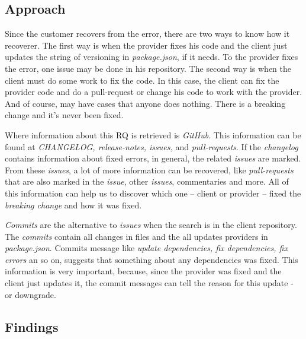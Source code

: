 \subsection{Approach}
\label{apr:rq3}

Since the customer recovers from the error, there are two ways to know how it recoverer. The first way is when the provider fixes his code and the client just updates the string of versioning in \textit{package.json}, if it needs. To the provider fixes the error, one issue may be done in his repository. The second way is when the client must do some work to fix the code. In this case, the client can fix the provider code and do a pull-request or change his code to work with the provider. And of course, may have cases that anyone does nothing. There is a breaking change and it’s never been fixed.

Where information about this RQ is retrieved is \textit{GitHub}. This information can be found at \textit{CHANGELOG, release-notes, issues,} and \textit{pull-requests}. If the \textit{changelog} contains information about fixed errors, in general, the related \textit{issues} are marked. From these \textit{issues}, a lot of more information can be recovered, like \textit{pull-requests} that are also marked in the \textit{issue}, other \textit{issues}, commentaries and more. All of this information can help us to discover which one -- client or provider -- fixed the \textit{breaking change} and how it was fixed.

\textit{Commits} are the alternative to \textit{issues} when the search is in the client repository. The \textit{commits} contain all changes in files and the all updates providers in \textit{package.json}. Commits message like \textit{update dependencies, fix dependencies, fix errors} an so on, suggests that something about any dependencies was fixed. This information is very important, because, since the provider was fixed and the client just updates it, the commit messages can tell the reason for this update - or downgrade.

\subsection{Findings}
\label{fin:rq3}